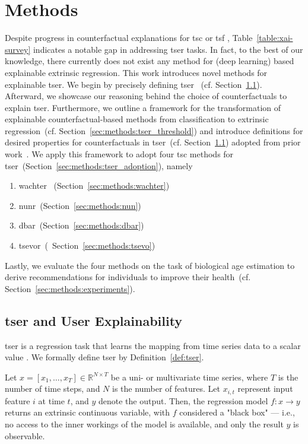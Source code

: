 \section{Methods}
Despite progress in counterfactual explanations for \gls{tsc} or \gls{tsf} \cite{theissler_explainable_2022, rojat_explainable_2021}, Table~\ref{table:xai-survey} indicates a notable gap in addressing \gls{tser} tasks. In fact, to the best of our knowledge, there currently does not exist any method for (deep learning) based explainable extrinsic regression. This work introduces novel methods for explainable \gls{tser}. 
We begin by precisely defining \gls{tser} ~(cf. Section~\ref{sec:methods:tser}). 
Afterward, we showcase our reasoning behind the choice of counterfactuals to explain \gls{tser}.
Furthermore, we outline a framework for the transformation of explainable counterfactual-based methods from classification to extrinsic regression~(cf. Section~\ref{sec:methods:tser_threshold}) and introduce definitions for desired properties for counterfactuals in \gls{tser}~(cf. Section~\ref{sec:methods:tser}) adopted from prior work~\cite{delaney_instance-based_2021}. We apply this framework to adopt four \gls{tsc} methods for \gls{tser}~(Section~\ref{sec:methods:tser_adoption}), namely 
\begin{enumerate}
    \item \gls{wachter} ~(Section~\ref{sec:methods:wachter})
    \item \gls{nunr}~(Section~\ref{sec:methods:nun})
    \item  \gls{dbar}~(Section~\ref{sec:methods:dbar})
    \item \gls{tsevor}~(~Section~\ref{sec:methods:tsevo})
\end{enumerate}
Lastly, we evaluate the four methods on the task of biological age estimation to derive recommendations for individuals to improve their health~(cf. Section~\ref{sec:methods:experiments}).


\label{sec:methods}
\subsection{\gls{tser} and User Explainability}
\label{sec:methods:tser}

\gls{tser} is a regression task that learns the mapping from time series data to a scalar value \cite{tan_time_2021}. We formally define \gls{tser} by Definition~\ref{def:tser}.
\begin{definition}
\label{def:tser}
Let $x=\left[x_{1}, \ldots, x_{T}\right] \in \mathbb{R}^{N \times T}$ be a uni- or multivariate time series, where $T$ is the number of time steps, and $N$ is the number of features. Let $x_{i,t}$ represent input feature $i$ at time $t$, and $y$ denote the output. Then, the regression model $f : x \rightarrow y$ returns an extrinsic continuous variable, with $f$ considered a "black box" — i.e., no access to the inner workings of the model is available, and only the result $y$ is observable.
\end{definition}

